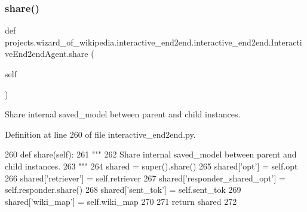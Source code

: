\mbox{\label{classprojects_1_1wizard__of__wikipedia_1_1interactive__end2end_1_1interactive__end2end_1_1InteractiveEnd2endAgent_a800136dd7ed44c1b94cd070600610c80}} 
\subsubsection{\texorpdfstring{share()}{share()}}
{\footnotesize\ttfamily def projects.\+wizard\+\_\+of\+\_\+wikipedia.\+interactive\+\_\+end2end.\+interactive\+\_\+end2end.\+Interactive\+End2end\+Agent.\+share (\begin{DoxyParamCaption}\item[{}]{self }\end{DoxyParamCaption})}

\begin{DoxyVerb}Share internal saved_model between parent and child instances.
\end{DoxyVerb}
 

Definition at line 260 of file interactive\+\_\+end2end.\+py.


\begin{DoxyCode}
260     \textcolor{keyword}{def }share(self):
261         \textcolor{stringliteral}{"""}
262 \textcolor{stringliteral}{        Share internal saved\_model between parent and child instances.}
263 \textcolor{stringliteral}{        """}
264         shared = super().share()
265         shared[\textcolor{stringliteral}{'opt'}] = self.opt
266         shared[\textcolor{stringliteral}{'retriever'}] = self.retriever
267         shared[\textcolor{stringliteral}{'responder\_shared\_opt'}] = self.responder.share()
268         shared[\textcolor{stringliteral}{'sent\_tok'}] = self.sent\_tok
269         shared[\textcolor{stringliteral}{'wiki\_map'}] = self.wiki\_map
270 
271         \textcolor{keywordflow}{return} shared
272 \end{DoxyCode}


